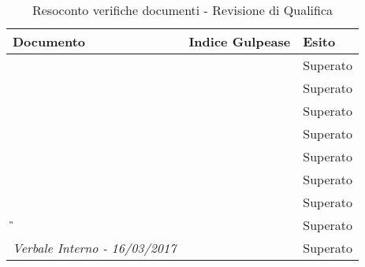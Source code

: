 		\begin{table}[H]
			\begin{longtable}{>{\centering\arraybackslash}p{5cm}|>{\centering\arraybackslash}p{5cm} | >{\centering\arraybackslash}p{5cm}}
				\hline
				\rowcolor{Gray}
				\textbf{Documento} & \textbf{Indice Gulpease} & \textbf{Esito} \\
				\hline
				\textit{\DDP} &   & Superato\\
				\hline
				\textit{\MU} &   & Superato\\
				\hline
				\textit{\ST} &   & Superato\\
				\hline
				\textit{\NdP} &   & Superato\\
				\hline
				\textit{\PdP} &  & Superato \\
				\hline
				\textit{\PdQ} &   & Superato\\
				\hline
				\textit{\AdR} &   & Superato \\
				\hline
				\textit{\G}&  & Superato\\
				\hline
				\textit{Verbale Interno - 16/03/2017}		& 		&	Superato	\\
				\hline
			\end{longtable}
			\caption{Resoconto verifiche documenti - Revisione di Qualifica}
		\end{table}

